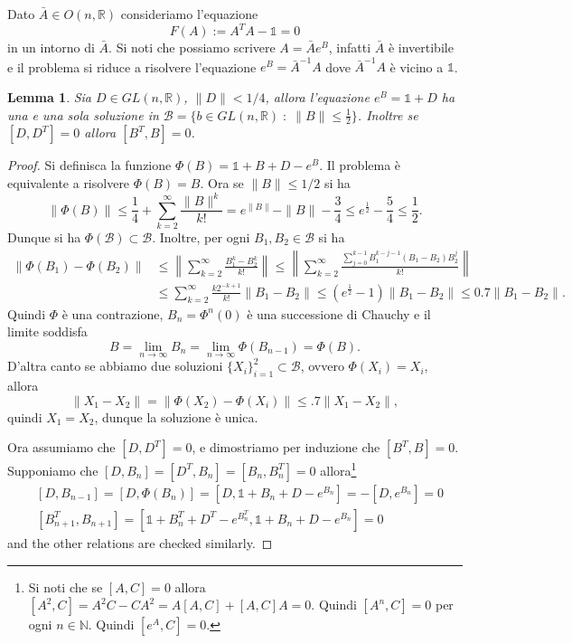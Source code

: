 \documentclass{amsart}
\numberwithin{equation}{section}
\newtheorem{lem}[thm]{Lemma}
\newcommand\cB{{\mathcal B}}
\newcommand\bN{{\mathbb N}}
\newcommand\bR{{\mathbb R}}
\newcommand\Id{{\mathds{1}}}
\begin{document}
Dato $\bar A\in O(n,\bR)$ consideriamo l'equazione
\begin{equation}\label{eq:SO}
F(A):=A^TA-\Id=0
\end{equation}
in un intorno di $\bar A$. Si noti che possiamo scrivere $A=\bar Ae^{B}$, infatti $\bar A$ \`e invertibile e il problema si riduce a risolvere l'equazione $e^B=\bar A^{-1}A$ dove $\bar A^{-1} A$ \`e vicino a $\Id$.
\begin{lem}\label{lem:exp} Sia $D\in  GL(n,\bR)$, $\|D\|<1/4$, allora l'equazione $e^B=\Id+D$ ha una e una sola soluzione in $\cB=\{b\in GL(n,\bR)\;:\; \|B\|\leq \frac 12\}$. Inoltre se $[D,D^T]=0$ allora $[B^T,B]=0$.
\end{lem}
\begin{proof} 
Si definisca la funzione $\Phi(B)=\Id+B+D-e^B$. Il problema \`e equivalente a risolvere 
$\Phi(B)=B$. Ora se $\|B\|\leq 1/2$ si ha
\[
\|\Phi(B)\|\leq \frac 14+\sum_{k=2}^\infty\frac{\|B\|^k}{k!}=e^{\|B\|}-\|B\|-\frac 34\leq e^{\frac 12}-\frac 54\leq \frac 12.
\]
Dunque si ha $\Phi(\cB)\subset \cB$.
Inoltre, per ogni $B_1,B_2\in\cB$ si ha
\[
\begin{split}
\|\Phi(B_1)-\Phi(B_2)\|&\leq \left\|\sum_{k=2}^\infty\frac{ B_1^k-B_2^k}{k!}\right\|
\leq \left\|\sum_{k=2}^\infty\frac{ \sum_{j=0}^{k-1}B_1^{k-j-1}(B_1-B_2)B_2^j}{k!}\right\|\\
&\leq \sum_{k=2}^\infty\frac{k2^{-k+1}}{k!}\|B_1-B_2\|\leq (e^{\frac 12}-1)\|B_1-B_2\|\leq 0.7\|B_1-B_2\|.
\end{split}
\]
Quindi $\Phi$ \`e una contrazione, $B_n=\Phi^n(0)$ \`e una successione di Chauchy e il limite soddisfa
\[
B=\lim_{n\to\infty} B_n=\lim_{n\to\infty} \Phi(B_{n-1})=\Phi(B).
\]
D'altra canto se abbiamo due soluzioni $\{X_i\}_{i=1}^2\subset\cB$, ovvero $\Phi(X_i)=X_i$, allora
\[
\|X_1-X_2\|=\|\Phi(X_2)-\Phi(X_i)\|\leq .7 \|X_1-X_2\|,
\]
quindi $X_1=X_2$, dunque la soluzione \`e unica.

Ora assumiamo che $[D,D^T]=0$, e dimostriamo per induzione che $[B^T,B]=0$. Supponiamo che $[D, B_n]=[D^T, B_n]=[B_n,B_n^T]=0$ allora\footnote{ Si noti che se $[A,C]=0$ allora $[A^2,C]=A^2C-CA^2=A[A,C]+[A,C]A=0$. Quindi $[A^n,C]=0$ per ogni $n\in\bN$. Quindi $[e^A,C]=0$.}
\[
\begin{split}
&[D,B_{n-1}]=[D,\Phi(B_n)]=[D, \Id+B_n+D-e^{B_n}]=-[D,e^{B_n}]=0\\
&[B_{n+1}^T,B_{n+1}]=[\Id+B_n^T+D^T-e^{B_n^T},\Id+B_n+D-e^{B_n}]=0
\end{split}
\]
and the other relations are checked similarly.
\end{proof}
\end{document}
